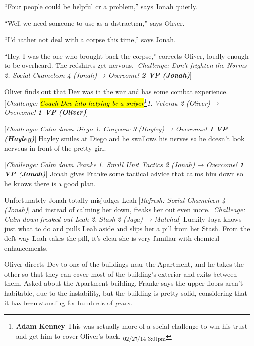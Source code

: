 ``Four people could be helpful or a problem,'' says Jonah quietly.

``Well we need someone to use as a distraction,'' says Oliver.

``I'd rather not deal with a corpse this time,'' says Jonah.

``Hey, I was the one who brought back the corpse,'' corrects Oliver, loudly enough to be overheard.  The redshirts get nervous.  {[}\textit{Challenge: Don't frighten the Norms 2.  Social Chameleon 4 (Jonah) → Overcome! }\textit{\textbf{2 VP (Jonah)}}{]}



Oliver finds out that Dev was in the war and has some combat experience. {[}\textit{Challenge: }\textit{\hl{Coach Dev into helping be a sniper}}\footnote{\textbf{Adam Kenney }This was actually more of a social challenge to win his trust and get him to cover Oliver's back. \textsubscript{02/27/14 3:01pm}}\textit{1. Veteran 2 (Oliver) → Overcome! }\textit{\textbf{1 VP (Oliver)}}{]}



{[}\textit{Challenge: Calm down Diego 1. Gorgeous 3 (Hayley) → Overcome! }\textit{\textbf{1 VP (Hayley)}}{]}  Hayley smiles at Diego and he swallows his nerves so he doesn't look nervous in front of the pretty girl.



{[}\textit{Challenge: Calm down Franke 1. Small Unit Tactics 2 (Jonah) → Overcome! }\textit{\textbf{1 VP (Jonah)}}{]} Jonah gives Franke some tactical advice that calms him down so he knows there is a good plan. 



Unfortunately Jonah totally misjudges Leah {[}\textit{Refresh: Social Chameleon 4 (Jonah)}{]} and instead of calming her down, freaks her out even more.  {[}\textit{Challenge: Calm down freaked out Leah 2. Stash 2 (Jaya) →  Matched}{]} Luckily Jaya knows just what to do and pulls Leah aside and slips her a pill from her Stash.  From the deft way Leah takes the pill, it's clear she is very familiar with chemical enhancements.



Oliver directs Dev to one of the buildings near the Apartment, and he takes the other so that they can cover most of the building's exterior and exits between them.  Asked about the Apartment building, Franke says the upper floors aren't habitable, due to the instability, but the building is pretty solid, considering that it has been standing for hundreds of years.




